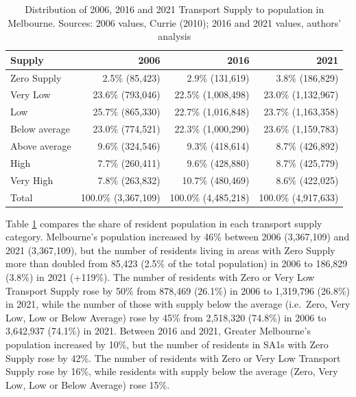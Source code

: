 \documentclass[preprint, 3p,
authoryear]{elsarticle} %
\begin{document}
\begin{table}

\caption{\label{tab:Greater_Melbourne_CCDs_SA1_population}Distribution of 2006, 2016 and 2021 Transport Supply to population in Melbourne. Sources: 2006 values, Currie (2010); 2016 and 2021 values, authors' analysis}
\centering
\begin{tabular}[t]{l|r|r|r}
\hline
Supply & 2006 & 2016 & 2021\\
\hline
Zero Supply & 2.5\%    (85,423) & 2.9\%   (131,619) & 3.8\%   (186,829)\\
\hline
Very Low & 23.6\%   (793,046) & 22.5\% (1,008,498) & 23.0\% (1,132,967)\\
\hline
Low & 25.7\%   (865,330) & 22.7\% (1,016,848) & 23.7\% (1,163,358)\\
\hline
Below average & 23.0\%   (774,521) & 22.3\% (1,000,290) & 23.6\% (1,159,783)\\
\hline
Above average & 9.6\%   (324,546) & 9.3\%   (418,614) & 8.7\%   (426,892)\\
\hline
High & 7.7\%   (260,411) & 9.6\%   (428,880) & 8.7\%   (425,779)\\
\hline
Very High & 7.8\%   (263,832) & 10.7\%   (480,469) & 8.6\%   (422,025)\\
\hline
Total & 100.0\% (3,367,109) & 100.0\% (4,485,218) & 100.0\% (4,917,633)\\
\hline
\end{tabular}
\end{table}

Table \ref{tab:Greater_Melbourne_CCDs_SA1_population} compares the share
of resident population in each transport supply category. Melbourne's
population increased by 46\% between 2006 (3,367,109) and 2021
(3,367,109), but the number of residents living in areas with Zero
Supply more than doubled from 85,423 (2.5\% of the total population) in
2006 to 186,829 (3.8\%) in 2021 (+119\%). The number of residents with
Zero or Very Low Transport Supply rose by 50\% from 878,469 (26.1\%) in
2006 to 1,319,796 (26.8\%) in 2021, while the number of those with
supply below the average (i.e.~Zero, Very Low, Low or Below Average)
rose by 45\% from 2,518,320 (74.8\%) in 2006 to 3,642,937 (74.1\%) in
2021. Between 2016 and 2021, Greater Melbourne's population increased by
10\%, but the number of residents in SA1s with Zero Supply rose by 42\%.
The number of residents with Zero or Very Low Transport Supply rose by
16\%, while residents with supply below the average (Zero, Very Low, Low
or Below Average) rose 15\%.
\end{document}
